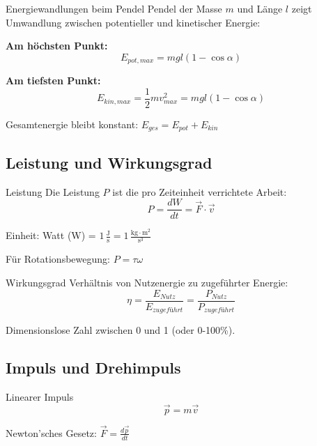 \begin{example2}{Energiewandlungen beim Pendel}
    Pendel der Masse $m$ und Länge $l$ zeigt Umwandlung zwischen potentieller und kinetischer Energie:
    
    \textbf{Am höchsten Punkt:}
    \begin{equation}
        E_{pot,max} = m g l (1 - \cos\alpha)
    \end{equation}
    
    \textbf{Am tiefsten Punkt:}
    \begin{equation}
        E_{kin,max} = \frac{1}{2} m v_{max}^2 = m g l (1 - \cos\alpha)
    \end{equation}
    
    Gesamtenergie bleibt konstant: $E_{ges} = E_{pot} + E_{kin}$
\end{example2}

\subsection{Leistung und Wirkungsgrad}

\begin{definition}{Leistung}
    Die Leistung $P$ ist die pro Zeiteinheit verrichtete Arbeit:
    \begin{equation}
        P = \frac{dW}{dt} = \vec{F} \cdot \vec{v}
    \end{equation}
    
    Einheit: Watt (W) = $1 \, \frac{\text{J}}{\text{s}} = 1 \, \frac{\text{kg} \cdot \text{m}^2}{\text{s}^3}$
    
    Für Rotationsbewegung: $P = \tau \omega$
\end{definition}

\begin{definition}{Wirkungsgrad}
    Verhältnis von Nutzenergie zu zugeführter Energie:
    \begin{equation}
        \eta = \frac{E_{Nutz}}{E_{zugeführt}} = \frac{P_{Nutz}}{P_{zugeführt}}
    \end{equation}
    
    Dimensionslose Zahl zwischen 0 und 1 (oder 0-100\%).
\end{definition}

\subsection{Impuls und Drehimpuls}

\begin{definition}{Linearer Impuls}
    \begin{equation}
        \vec{p} = m\vec{v}
    \end{equation}
    
    Newton'sches Gesetz: $\vec{F} = \frac{d\vec{p}}{dt}$
\end{definition}

